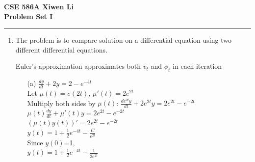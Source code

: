 \documentclass[11pt]{article}
\begin{document}
\thispagestyle{empty}
{\large{\bf CSE 586A  \hfill Xiwen Li}}\\

{\LARGE{\bf Problem Set I}}
\vspace{0.2\baselineskip}
\hrule


\begin{enumerate}
\item The problem is to compare solution on a differential equation using two different differential equations.

Euler's approximation approximates both $v_{t}$ and $\phi_{t}$ in each iteration

\begin{enumerate}

	\item[(a)] 	$\frac{dy}{dt}+2y=2-e^{-4t}$\\
	\newline
	Let $\mu(t)=e(2t)$, $\mu'(t)=2e^{2t}$\\
	\newline
	Multiply both sides by $\mu(t)$: $\frac{de^{2t}y}{dt}+2e^{2t}y=2e^{2t}-e^{-2t}$\\
	\newline
	$\mu(t)\frac{dy}{dt}+\mu'(t)y=2e^{2t}-e^{-2t}$\\
	\newline
	$(\mu(t)y(t))'=2e^{2t}-e^{-2t}$\\
	\newline
	$y(t)=1+\frac{1}{2}e^{-4t}-\frac{C}{e^{2t}}$\\
	\newline
	Since $y(0)$=1,\\
	\newline
	$y(t)=1+\frac{1}{2}e^{-4t}-\frac{1}{2e^{2t}}$\\
	

\end{enumerate}
\end{enumerate}
\end{document}
